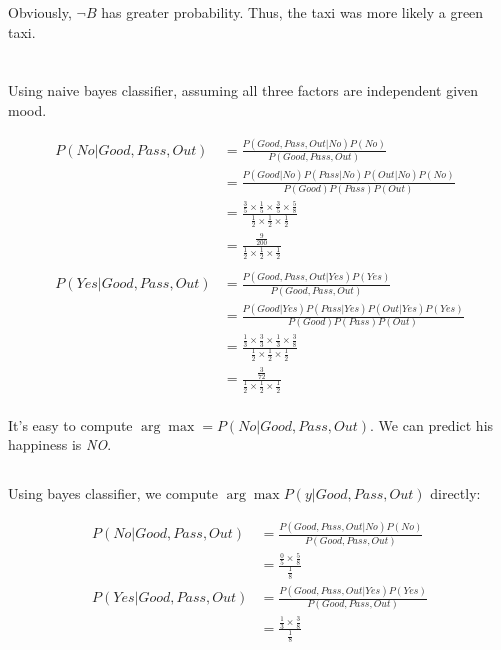 \documentclass[12pt, letterpaper]{article}
\begin{document}
Obviously, $\lnot B$ has greater probability. Thus, the taxi was more likely a
green taxi.

\pagebreak

\section{}

\subsection{}

Using naive bayes classifier, assuming all three factors are independent given mood.

\begin{align*}
P(No|Good, Pass, Out)
&=\frac{P(Good, Pass, Out|No){P(No)}}{P(Good, Pass, Out)}\\
&=\frac{P(Good|No) P(Pass|No) P(Out|No){P(No)}}{P(Good) P(Pass) P(Out)}\\
&=\frac{\frac{3}{5}\times\frac{1}{5}\times\frac{3}{5}\times\frac{5}{8}}{\frac{1}{2}\times\frac{1}{2}\times\frac{1}{2}}\\
&=\frac{\frac{9}{200}}{\frac{1}{2}\times\frac{1}{2}\times\frac{1}{2}}\\\\
P(Yes|Good, Pass, Out)
&=\frac{P(Good, Pass, Out|Yes){P(Yes)}}{P(Good, Pass, Out)}\\
&=\frac{P(Good|Yes) P(Pass|Yes) P(Out|Yes){P(Yes)}}{P(Good) P(Pass) P(Out)}\\
&=\frac{\frac{1}{3}\times\frac{3}{3}\times\frac{1}{3}\times\frac{3}{8}}{\frac{1}{2}\times\frac{1}{2}\times\frac{1}{2}}\\
&=\frac{\frac{3}{72}}{\frac{1}{2}\times\frac{1}{2}\times\frac{1}{2}}\\
\end{align*}

It's easy to compute $\arg\max = P(No|Good, Pass, Out)$. We can predict his
happiness is \emph{NO}.

\subsection{}

Using bayes classifier, we compute $\arg\max P(y|Good, Pass, Out)$ directly:

\begin{align*}
P(No|Good, Pass, Out)
&=\frac{P(Good, Pass, Out|No){P(No)}}{P(Good, Pass, Out)}\\
&=\frac{\frac{0}{5}\times\frac{5}{8}}{\frac{1}{8}}\\
P(Yes|Good, Pass, Out)
&=\frac{P(Good, Pass, Out|Yes){P(Yes)}}{P(Good, Pass, Out)}\\
&=\frac{\frac{1}{3}\times\frac{3}{8}}{\frac{1}{8}}
\end{align*}
\end{document}
